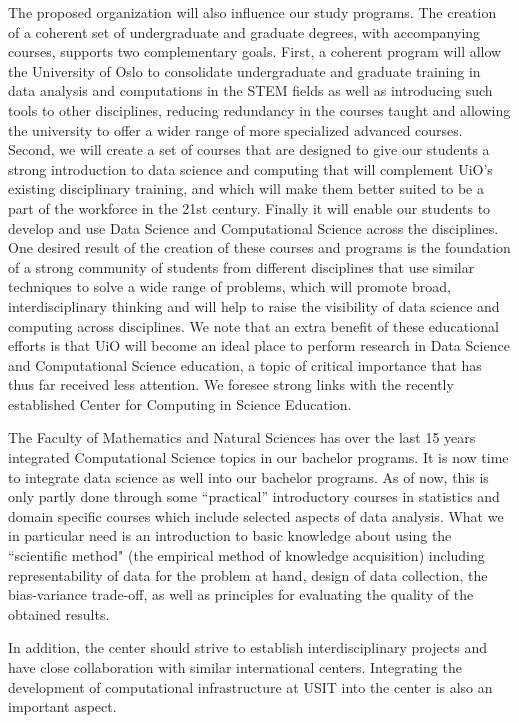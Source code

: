 \documentclass[a4paper,10pt]{article}
\begin{document}
The proposed organization will also influence our study programs. 
The creation of a coherent set of undergraduate and graduate degrees, with accompanying courses, supports two complementary goals. First, a coherent program will allow the University of Oslo to consolidate undergraduate and graduate training in data analysis and computations in the STEM fields as well as introducing such tools to other disciplines, reducing redundancy in the courses taught and allowing the university to offer a wider range of more specialized advanced courses. Second, we will create a set of courses that are designed to give our students a strong introduction to data science and computing that will complement UiO’s existing disciplinary training, and which will make them better suited to be a part of the workforce in the 21st century. Finally it will enable our students to develop and use Data Science and Computational Science across the disciplines.
One desired result of the creation of these courses and programs is the foundation of a strong community of students from different disciplines that use similar techniques to solve a wide range of problems, which will promote broad, interdisciplinary thinking and will help to raise the visibility of data science and computing across disciplines. 
We note that an extra benefit of these educational efforts is that UiO will become an ideal place to perform research in Data Science and Computational Science education, a topic of critical importance that has thus far received less attention. We foresee strong links with the recently established Center for Computing in Science Education. 

The Faculty of Mathematics and Natural Sciences has over the last 15 years integrated Computational Science topics in our bachelor programs. It is now time to integrate data science as well into our bachelor programs. As of now, this is only partly done  through some “practical” introductory courses in statistics and domain specific courses which include selected aspects of data analysis. What we in particular need is an introduction to basic knowledge about using the “scientific method" (the empirical method of knowledge acquisition) including representability of data for the problem at hand, design of data collection, the bias-variance trade-off, as well as principles for evaluating the quality of the obtained results.

In addition, the center should strive to establish  interdisciplinary projects and have close collaboration with similar international centers.  Integrating the development of computational infrastructure at USIT into the center is also an important aspect. 
\end{document}
